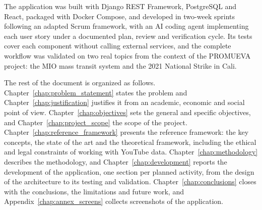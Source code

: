 The application was built with Django REST Framework, PostgreSQL and React, packaged with Docker Compose, and developed in two-week sprints following an adapted Scrum framework, with an AI coding agent implementing each user story under a documented plan, review and verification cycle. Its tests cover each component without calling external services, and the complete workflow was validated on two real topics from the context of the PROMUEVA project: the MIO mass transit system and the 2021 National Strike in Cali.

The rest of the document is organized as follows. Chapter~\ref{chap:problem_statement} states the problem and Chapter~\ref{chap:justification} justifies it from an academic, economic and social point of view. Chapter~\ref{chap:objectives} sets the general and specific objectives, and Chapter~\ref{chap:project_scope} the scope of the project. Chapter~\ref{chap:reference_framework} presents the reference framework: the key concepts, the state of the art and the theoretical framework, including the ethical and legal constraints of working with YouTube data. Chapter~\ref{chap:methodology} describes the methodology, and Chapter~\ref{chap:development} reports the development of the application, one section per planned activity, from the design of the architecture to its testing and validation. Chapter~\ref{chap:conclusions} closes with the conclusions, the limitations and future work, and Appendix~\ref{chap:annex_screens} collects screenshots of the application.
